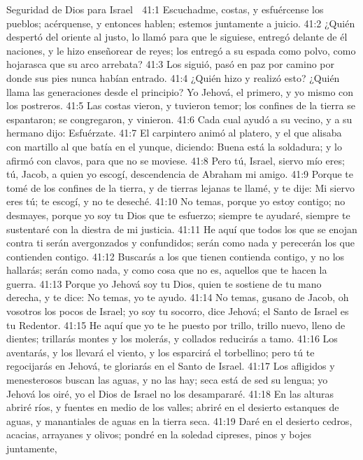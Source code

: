 Seguridad de Dios para Israel  

41:1 Escuchadme, costas, y esfuércense los pueblos; acérquense, y entonces hablen; estemos juntamente a juicio.  
41:2 ¿Quién despertó del oriente al justo, lo llamó para que le siguiese, entregó delante de él naciones, y le hizo enseñorear de reyes; los entregó a su espada como polvo, como hojarasca que su arco arrebata?  
41:3 Los siguió, pasó en paz por camino por donde sus pies nunca habían entrado.  
41:4 ¿Quién hizo y realizó esto? ¿Quién llama las generaciones desde el principio? Yo Jehová, el primero, y yo mismo con los postreros.  
41:5 Las costas vieron, y tuvieron temor; los confines de la tierra se espantaron; se congregaron, y vinieron.  
41:6 Cada cual ayudó a su vecino, y a su hermano dijo: Esfuérzate.  
41:7 El carpintero animó al platero, y el que alisaba con martillo al que batía en el yunque, diciendo: Buena está la soldadura; y lo afirmó con clavos, para que no se moviese.  
41:8 Pero tú, Israel, siervo mío eres; tú, Jacob, a quien yo escogí, descendencia de Abraham mi amigo. 
41:9 Porque te tomé de los confines de la tierra, y de tierras lejanas te llamé, y te dije: Mi siervo eres tú; te escogí, y no te deseché.  
41:10 No temas, porque yo estoy contigo; no desmayes, porque yo soy tu Dios que te esfuerzo; siempre te ayudaré, siempre te sustentaré con la diestra de mi justicia.  
41:11 He aquí que todos los que se enojan contra ti serán avergonzados y confundidos; serán como nada y perecerán los que contienden contigo.  
41:12 Buscarás a los que tienen contienda contigo, y no los hallarás; serán como nada, y como cosa que no es, aquellos que te hacen la guerra.  
41:13 Porque yo Jehová soy tu Dios, quien te sostiene de tu mano derecha, y te dice: No temas, yo te ayudo.  
41:14 No temas, gusano de Jacob, oh vosotros los pocos de Israel; yo soy tu socorro, dice Jehová; el Santo de Israel es tu Redentor.  
41:15 He aquí que yo te he puesto por trillo, trillo nuevo, lleno de dientes; trillarás montes y los molerás, y collados reducirás a tamo.  
41:16 Los aventarás, y los llevará el viento, y los esparcirá el torbellino; pero tú te regocijarás en Jehová, te gloriarás en el Santo de Israel.  
41:17 Los afligidos y menesterosos buscan las aguas, y no las hay; seca está de sed su lengua; yo Jehová los oiré, yo el Dios de Israel no los desampararé.  
41:18 En las alturas abriré ríos, y fuentes en medio de los valles; abriré en el desierto estanques de aguas, y manantiales de aguas en la tierra seca.  
41:19 Daré en el desierto cedros, acacias, arrayanes y olivos; pondré en la soledad cipreses, pinos y bojes juntamente,  
